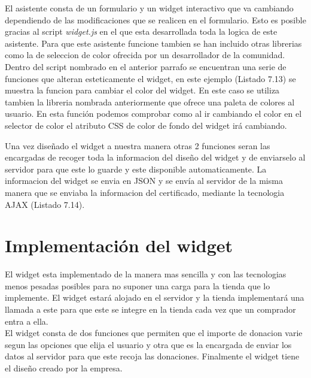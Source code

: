 El asistente consta de un formulario y un widget interactivo que va cambiando dependiendo de las modificaciones que se realicen en el formulario. Esto es posible gracias al script \textit{widget.js} en el que esta desarrollada toda la logica de este asistente. Para que este asistente funcione tambien se han incluido otras librerias como la de seleccion de color\cite{colorpicker} ofrecida por un desarrollador de la comunidad.\\

Dentro del script nombrado en el anterior parrafo se encuentran una serie de funciones que alteran esteticamente el widget, en este ejemplo (Listado 7.13) se muestra la funcion para cambiar el color del widget. En este caso se utiliza tambien la libreria nombrada anteriormente que ofrece una paleta de colores al usuario.  En esta función podemos comprobar como al ir cambiando el color en el selector de color el atributo CSS de color de fondo del widget irá cambiando.\\


Una vez diseñado el widget a nuestra manera otras 2 funciones seran las encargadas de recoger toda la informacion del diseño del widget y de enviarselo al servidor para que este lo guarde y este disponible automaticamente. La informacion del widget se envia en JSON y se envía al servidor de la misma manera que se enviaba la informacion del certificado, mediante la tecnologia AJAX (Listado 7.14).\\


\section{Implementación del widget}
El widget esta implementado de la manera mas sencilla y con las tecnologias menos pesadas posibles para no suponer una carga para la tienda que lo implemente. El widget estará alojado en el servidor y la tienda implementará una llamada a este para que este se integre en la tienda cada vez que un comprador entra a ella.\\

El widget consta de dos funciones que permiten que el importe de donacion varie segun las opciones que elija el usuario y otra que es la encargada de enviar los datos al servidor para que este recoja las donaciones. Finalmente el widget tiene el diseño creado por la empresa.\\

